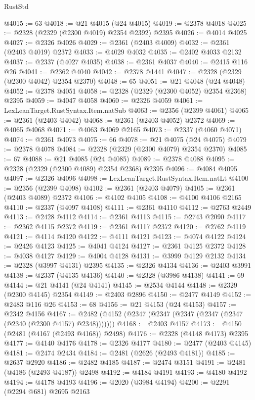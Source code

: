 \begin{lexlean}{RustStd}
\begin{coremodule}
{\begin{coremodule}
{{{{{{{{{{{{{{{{{{{{{{{{{{{{{{{{{{{{{@4015 := 63
@4018 := @21 @4015 (@24 @4015)
@4019 := @2378 @4018
@4025 := @2328 (@2329 (@2300 @4019) @2354 @2392) @2395
@4026 := @4014 @4025
@4027 := @2326 @4026
@4029 := @2361 (@2403 @4009)
@4032 := @2361 (@2403 @4019) @2372
@4033 := @4029 @4032
@4035 := @2402 @4033 @2132
@4037 := @2337 (@4027 @4035)
@4038 := @2361 @4037
@4040 := @2415 @116 @26
@4041 := @2362 @4040
@4042 := @2378 @1441
@4047 := @2328 (@2329 (@2300 @4042) @2354 @2370)
@4048 := 65
@4051 := @21 @4048 (@24 @4048)
@4052 := @2378 @4051
@4058 := @2328 (@2329 (@2300 @4052) @2354 @2368) @2395
@4059 := @4047 @4058
@4060 := @2326 @4059
@4061 := LexLeanTarget.RustSyntax.Item.natSub
@4063 := @2356 (@2399 @4061)
@4065 := @2361 (@2403 @4042)
@4068 := @2361 (@2403 @4052) @2372
@4069 := @4065 @4068
@4071 := @4063 @4069 @2165
@4073 := @2337 (@4060 @4071)
@4074 := @2361 @4073
@4075 := 66
@4078 := @21 @4075 (@24 @4075)
@4079 := @2378 @4078
@4084 := @2328 (@2329 (@2300 @4079) @2354 @2370)
@4085 := 67
@4088 := @21 @4085 (@24 @4085)
@4089 := @2378 @4088
@4095 := @2328 (@2329 (@2300 @4089) @2354 @2368) @2395
@4096 := @4084 @4095
@4097 := @2326 @4096
@4098 := LexLeanTarget.RustSyntax.Item.natLt
@4100 := @2356 (@2399 @4098)
@4102 := @2361 (@2403 @4079)
@4105 := @2361 (@2403 @4089) @2372
@4106 := @4102 @4105
@4108 := @4100 @4106 @2165
@4110 := @2337 (@4097 @4108)
@4111 := @2361 @4110
@4112 := @2763 @2449
@4113 := @2428 @4112
@4114 := @2361 @4113
@4115 := @2743 @2090
@4117 := @2362 @4115 @2372
@4119 := @2361 @4117 @2372
@4120 := @2762 @4119
@4121 := @4114 @4120
@4122 := @4111 @4121
@4123 := @4074 @4122
@4124 := @2426 @4123
@4125 := @4041 @4124
@4127 := @2361 @4125 @2372
@4128 := @4038 @4127
@4129 := @4004 @4128
@4131 := @3999 @4129 @2132
@4134 := @2328 (@3997 @4131) @2395
@4135 := @2326 @4134
@4136 := @2403 @3991
@4138 := @2337 (@4135 @4136)
@4140 := @2328 (@3986 @4138)
@4141 := 69
@4144 := @21 @4141 (@24 @4141)
@4145 := @2534 @4144
@4148 := @2329 (@2300 @4145) @2354
@4149 := @2403 @2896
@4150 := @2477 @4149
@4152 := @2483 @116 @26
@4153 := 68
@4156 := @21 @4153 (@24 @4153)
@4157 := @2342 @4156
@4167 := @2482 (@4152 (@2347 (@2347 (@2347 (@2347 (@2347 (@2340 (@2300 @4157) @2348)))))))
@4168 := @2403 @4157
@4173 := @4150 (@2481 (@4167 (@2493 @4168)) @2498)
@4176 := @2328 (@4148 @4173) @2395
@4177 := @4140 @4176
@4178 := @2326 @4177
@4180 := @2477 (@2403 @4145)
@4181 := @2474 @2434
@4184 := @2481 (@2626 (@2493 @4181))
@4185 := @2637 @2920
@4186 := @2482 @4185
@4187 := @2474 @3151
@4191 := @2481 (@4186 (@2493 @4187)) @2498
@4192 := @4184 @4191
@4193 := @4180 @4192
@4194 := @4178 @4193
@4196 := @2020 (@3984 @4194)
@4200 := @2291 (@2294 @681) @2695 @2163
}}}}}}}}}}}}}}}}}}}}}}}}}}}}}}}}}}}}}
\end{coremodule}}
\end{coremodule}
\end{lexlean}
